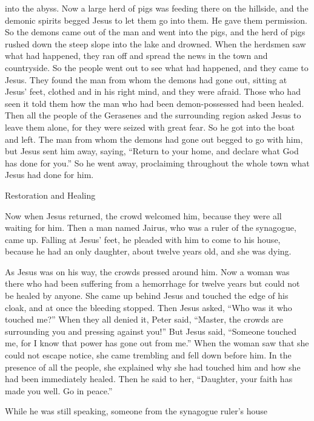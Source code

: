 {into
the abyss.
Now
a large
herd
of pigs
was feeding
there
on
the hillside,
and the demonic spirits begged
Jesus
to
let
them
go
into
them.
He gave
them
permission.
So
the demons
came out
of
the man
and went
into
the pigs,
and
the herd
of pigs rushed down
the steep slope
into
the lake
and
drowned.
When
the herdsmen
saw
what had happened,
they ran off
and
spread the news
in
the town
and
countryside.
So the people went out
to see
what had happened,
and
they came
to
Jesus.
They found
the man
from
whom
the demons
had gone out,
sitting
at
Jesus’
feet,
clothed
and
in his right mind,
and
they were afraid.
Those who had seen
it told
them
how
the man who had been demon-possessed
had been healed.
Then
all
the people
of the Gerasenes
and the surrounding region
asked
Jesus
to leave
them
alone, for
they were seized with
great
fear.
So
he got
into
the boat
and left.
The man
from
whom
the demons
had gone out
begged
to go with
him,
but Jesus sent
him
away,
saying,
“Return
to
your
home,
and
declare
what
God
has done
for you.”
So
he went away,
proclaiming
throughout
the whole
town
what
Jesus
had done
for him.
\par }{\SH Restoration and Healing
\par }{\PP {}Now
when Jesus
returned,
the crowd
welcomed
him,
because
they were
all
waiting
for him.
Then
a man
named
Jairus,
who was
a ruler
of the synagogue,
came up.
Falling
at
Jesus’
feet,
he pleaded
with him
to come
to
his
house,
because
he had
an only
daughter,
about
twelve
years
old, and
she was dying.
\par }{\PP As Jesus was on
his
way,
the crowds
pressed around
him.
Now
a woman
was there who had been
suffering
from
a hemorrhage
for twelve
years
but could
not
be healed
by
anyone.
She came up
behind
Jesus and touched
the edge
of his
cloak,
and
at once
the bleeding
stopped.
Then
Jesus
asked, “Who
was it who touched
me?” When
they all
denied
it, Peter
said,
“Master,
the crowds
are surrounding
you
and
pressing against you!”
But
Jesus
said,
“Someone touched
me,
for
I
know
that power
has gone out
from
me.”
When
the woman
saw
that
she could
not
escape notice,
she came
trembling
and
fell down before
him.
In the presence
of all
the people,
she explained
why
she had touched
him
and
how
she had been
immediately
healed.
Then
he said
to her,
“Daughter,
your
faith
has made
you
well.
Go
in
peace.”
\par }{\PP {}While
he
was still speaking,
someone
from
the synagogue ruler’s house
}
